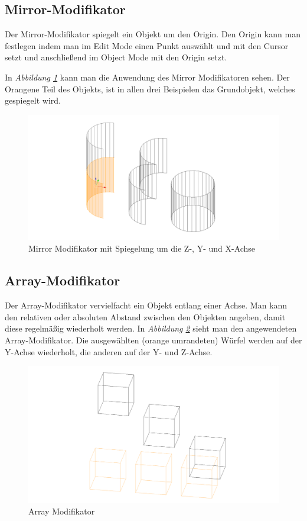 \subsection{Mirror-Modifikator}\citep{blender:mirror_modifier}
\label{Mirror:heading}
Der Mirror-Modifikator spiegelt ein Objekt um den Origin.
Den Origin kann man festlegen indem man im Edit Mode einen Punkt auswählt
und mit   den Cursor setzt und anschließend im Object Mode mit 
 den Origin setzt.

In \textit{Abbildung \ref{modifikatoren:image2}} kann man die Anwendung des Mirror Modifikatoren sehen. Der Orangene Teil des Objekts, ist in allen drei Beispielen das
Grundobjekt, welches gespiegelt wird.

\begin{figure}[h]
    \centering
    \includegraphics[width=.8\textwidth]{images/Modifikatoren-Mirror.png}
    \caption{Mirror Modifikator mit Spiegelung um die Z-, Y- und X-Achse}
    \label{modifikatoren:image2}
\end{figure}

\subsection{Array-Modifikator}\citep{blender:array_modifier}
\label{Array:heading}
Der Array-Modifikator vervielfacht ein Objekt entlang einer Achse. Man kann den relativen oder absoluten Abstand zwischen den Objekten
angeben, damit diese regelmäßig wiederholt werden. In \textit{Abbildung \ref{modifikatoren:image3}} sieht man den angewendeten Array-Modifikator.
Die ausgewählten (orange umrandeten) Würfel werden auf der Y-Achse
wiederholt, die anderen auf der Y- und Z-Achse.
\begin{figure}[h]
    \centering
    \includegraphics[width=.8\textwidth]{images/Modifikatoren-Array.png}
    \caption{Array Modifikator}
    \label{modifikatoren:image3}
\end{figure}

